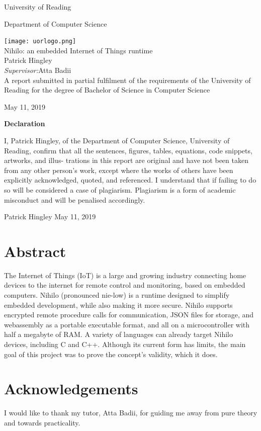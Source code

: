 \documentclass{article}
\begin{document}
\begin{center}
\huge{University of Reading

Department of Computer Science}

\texttt{[image: uorlogo.png]}\\[10mm]

\Huge{Nihilo: an embedded Internet of Things runtime}\\[10mm]
 
\huge{Patrick Hingley}\\[10mm]

\Large{\emph{Supervisor:}Atta Badii}\\[10mm]

A report submitted in partial fulfilment of the requirements of
the University of Reading for the degree of
Bachelor of Science in Computer Science

May 11, 2019
\end{center}
\pagebreak
\large{\textbf{Declaration}}

I, Patrick Hingley, of the Department of Computer Science, University of Reading,
confirm that all the sentences, figures, tables, equations, code snippets, artworks, and illus-
trations in this report are original and have not been taken from any other person’s work,
except where the works of others have been explicitly acknowledged, quoted, and referenced.
I understand that if failing to do so will be considered a case of plagiarism. Plagiarism is a
form of academic misconduct and will be penalised accordingly.

Patrick Hingley
May 11, 2019

\pagebreak
\section{Abstract}
The Internet of Things (IoT) is a large and growing industry connecting home devices to the internet for remote control and monitoring, based on embedded computers. Nihilo (pronounced nie-low) is a runtime designed to simplify embedded development, while also making it more secure. Nihilo supports encrypted remote procedure calls for communication, JSON files for storage, and webassembly as a portable executable format, and all on a microcontroller with half a megabyte of RAM. A variety of languages can already target Nihilo devices, including C and C++. Although its current form has limits, the main goal of this project was to prove the concept's validity, which it does.

\section{Acknowledgements}
I would like to thank my tutor, Atta Badii, for guiding me away from pure theory and towards practicality.
\end{document}

